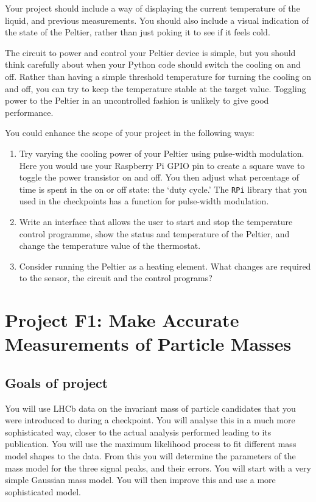 Your project should include a way of displaying the current temperature of the liquid, and previous measurements.
You should also include a visual indication of the state of the Peltier, rather than just poking it to see if it feels cold.

The circuit to power and control your Peltier device is simple, but you should think carefully about when your Python code should switch the cooling on and off.
Rather than having a simple threshold temperature for turning the cooling on and off, you can try to keep the temperature stable at the target value.
Toggling power to the Peltier in an uncontrolled fashion is unlikely to give good performance.

\newpage
You could enhance the scope of your project in the following ways:
\begin{enumerate}
	\item Try varying the cooling power of your Peltier using pulse-width modulation.
		Here you would use your Raspberry Pi GPIO pin to create a square wave to toggle the power transistor on and off.
		You then adjust what percentage of time is spent in the on or off state: the `duty cycle.'
    The \texttt{RPi} library that you used in the checkpoints has a function for pulse-width modulation.
	\item Write an interface that allows the user to start and stop the temperature control programme, show the status and temperature of the Peltier, and change the temperature value of the thermostat.
	\item Consider running the Peltier as a heating element.
    What changes are required to the sensor, the circuit and the control programs?
\end{enumerate}


 
 
 
\newpage
\section{Project F1: Make Accurate Measurements of Particle Masses}

\subsection{Goals of project}

You will use LHCb data on the invariant mass of particle candidates that you were introduced to during a checkpoint.
You will analyse this in a much more sophisticated way, closer to the actual analysis performed leading to its publication.
You will use the maximum likelihood process to fit different mass model shapes to the data.
From this you will determine the parameters of the mass model for the three signal peaks, and their errors.
You will start with a very simple Gaussian mass model.
You will then improve this and use a more sophisticated model.

